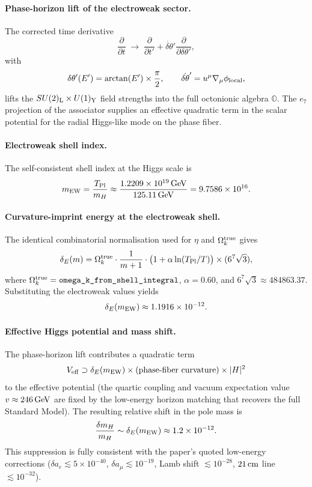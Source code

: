 \documentclass[12pt,a4paper]{article}
\begin{document}
\paragraph{Phase-horizon lift of the electroweak sector.}
The corrected time derivative
\[
\frac{\partial}{\partial t} \;\to\; \frac{\partial}{\partial t'} + \dot{\delta\theta}' \frac{\partial}{\partial \delta\theta'},
\]
with
\[
\delta\theta'(E') = \arctan(E') \times \frac{\pi}{2}, \qquad
\dot{\delta\theta}' = u^\mu \nabla_\mu \phi_{\rm local},
\]
lifts the $SU(2)_{\rm L} \times U(1)_{\rm Y}$ field strengths into the full octonionic algebra $\mathbb{O}$. The $e_7$ projection of the associator supplies an effective quadratic term in the scalar potential for the radial Higgs-like mode on the phase fiber.

\paragraph{Electroweak shell index.}
The self-consistent shell index at the Higgs scale is
\[
m_{\rm EW} = \frac{T_{\rm Pl}}{m_H} \approx \frac{1.2209 \times 10^{19}\,\rm GeV}{125.11\,\rm GeV} = 9.7586 \times 10^{16}.
\]

\paragraph{Curvature-imprint energy at the electroweak shell.}
The identical combinatorial normalisation used for $\eta$ and $\Omega_k^{\rm true}$ gives
\[
\delta_E(m) = \Omega_k^{\rm true} \cdot \frac{1}{m+1} \cdot \bigl(1 + \alpha \ln(T_{\rm Pl}/T)\bigr) \times (6^7 \sqrt{3}),
\]
where $\Omega_k^{\rm true} = \texttt{omega\_k\_from\_shell\_integral}$, $\alpha = 0.60$, and $6^7 \sqrt{3} \approx 484863.37$. Substituting the electroweak values yields
\[
\delta_E(m_{\rm EW}) \approx 1.1916 \times 10^{-12}.
\]



\paragraph{Effective Higgs potential and mass shift.}
The phase-horizon lift contributes a quadratic term
\[
V_{\rm eff} \supset \delta_E(m_{\rm EW}) \times (\text{phase-fiber curvature}) \times |H|^2
\]
to the effective potential (the quartic coupling and vacuum expectation value $v \approx 246\,\rm GeV$ are fixed by the low-energy horizon matching that recovers the full Standard Model). The resulting relative shift in the pole mass is
\[
\frac{\delta m_H}{m_H} \sim \delta_E(m_{\rm EW}) \approx 1.2 \times 10^{-12}.
\]
This suppression is fully consistent with the paper's quoted low-energy corrections ($\delta a_e \lesssim 5\times10^{-40}$, $\delta a_\mu \lesssim 10^{-19}$, Lamb shift $\lesssim 10^{-28}$, $21\,\rm cm$ line $\lesssim 10^{-32}$).
\end{document}
